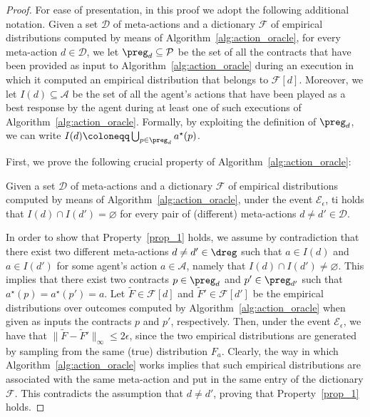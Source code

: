 \boundedactions*
\begin{proof} 
	For ease of presentation, in this proof we adopt the following additional notation.
	Given a set $\mathcal{D}$ of meta-actions and a dictionary $\mathcal{F}$ of empirical distributions computed by means of Algorithm~\ref{alg:action_oracle}, for every meta-action $d \in \mathcal{D}$, we let $\preg_d \subseteq \mathcal{P}$ be the set of all the contracts that have been provided as input to Algorithm~\ref{alg:action_oracle} during an execution in which it computed an empirical distribution that belongs to $\mathcal{F}[d]$.
	Moreover, we let $I(d) \subseteq \mathcal{A}$ be the set of all the agent's actions that have been played as a best response by the agent during at least one of such executions of  Algorithm~\ref{alg:action_oracle}.
	Formally, by exploiting the definition of $\preg_d$, we can write $I(d) \coloneqq \bigcup_{p \in \preg_d} a^\star(p)$.
	
	
	
	First, we prove the following crucial property of Algorithm~\ref{alg:action_oracle}:
	\begin{property}\label{prop_1}
	Given a set $\mathcal{D}$ of meta-actions and a dictionary $\mathcal{F}$ of empirical distributions computed by means of Algorithm~\ref{alg:action_oracle}, under the event $\mathcal{E}_\epsilon$, ti holds that $I(d) \cap I(d') = \varnothing$ for every pair of (different) meta-actions $d \neq  d' \in \mathcal{D}$.
	\end{property}
	In order to show that Property~\ref{prop_1} holds, we assume by contradiction that there exist two different meta-actions $d \neq d' \in \dreg$ such that $a \in I(d)$ and $a \in I(d')$ for some agent's action $a \in \mathcal{A}$, namely that $I(d) \cap I(d') \neq \varnothing$. This implies that there exist two contracts $p \in \preg_{d}$ and $p' \in \preg_{d'}$ such that $a^\star(p) = a^\star(p') = a $. Let $\widetilde{F} \in  \mathcal{F}[d]$ and $\widetilde{F}' \in \mathcal{F}[d']$ be the empirical distributions over outcomes computed by Algorithm~\ref{alg:action_oracle} when given as inputs the contracts $p$ and $p'$, respectively.
	Then, under the event $\mathcal{E}_\epsilon$, we have that $\| \widetilde{F} -\widetilde{F}' \|_\infty \leq 2\epsilon$, since the two empirical distributions are generated by sampling from the same (true) distribution $F_a$.
	Clearly, the way in which Algorithm~\ref{alg:action_oracle} works implies that such empirical distributions are associated with the same meta-action and put in the same entry of the dictionary $\mathcal{F}$.
	This contradicts the assumption that $d \neq d'$, proving that Property~\ref{prop_1} holds. 


\end{proof}
